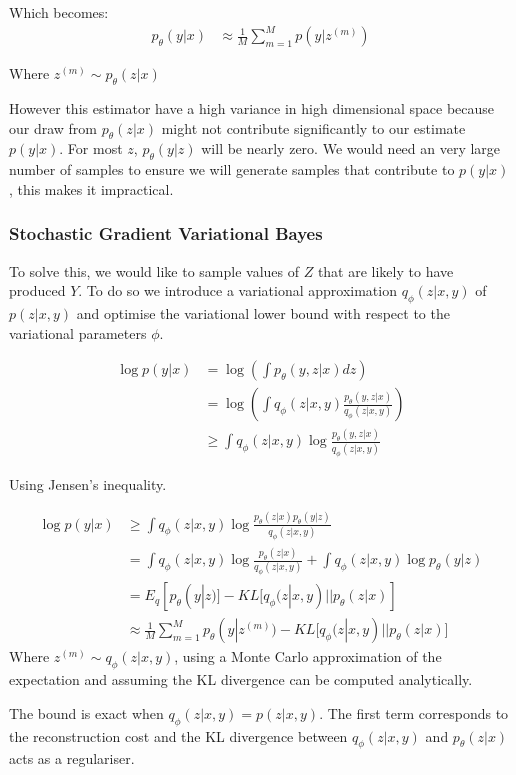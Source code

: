 \documentclass[11pt,oneside,openright]{report}
\begin{document}
Which becomes:
\begin{align}
 p_\theta(y|x) &\approx \frac{1}{M} \sum^M_{m=1} p(y | z^{(m)}) 
\end{align}

Where $ z^{(m)} \sim p_\theta(z|x) $

However this estimator have a high variance in high dimensional space because our draw from $p_\theta(z | x)$ might not contribute significantly to our estimate $p(y |x)$. For most $z$, $p_\theta(y|z)$ will be nearly zero. We would need an very large number of samples to ensure we will generate samples that contribute to $p(y|x)$, this makes it impractical.

\subsubsection{Stochastic Gradient Variational Bayes}

To solve this, we would like to sample values of $Z$ that are likely to have produced $Y$. To do so we introduce a variational approximation $q_\phi(z|x, y)$ of $p(z|x, y)$ and optimise the variational lower bound with respect to the variational parameters $\phi$.
 
\begin{align}
 \log p(y|x) &= \log(\int p_\theta(y, z|x) dz) \\
 & =  \log(\int q_\phi(z|x, y) \frac{p_\theta(y, z|x)}{q_\phi(z|x, y)}) \\
 & \geq \int q_\phi(z|x, y) \log \frac{p_\theta(y, z|x)}{q_\phi(z|x, y)}
\end{align}

Using Jensen's inequality.

\begin{align}
 \log p(y|x) & \geq \int q_\phi(z|x, y) \log \frac{p_\theta(z|x) p_\theta(y| z)}{q_\phi(z|x, y)} \\
  &= \int q_\phi(z|x, y) \log \frac{p_\theta(z|x)}{q_\phi(z|x, y)}  + \int q_\phi(z|x, y) \log p_\theta(y|z) \\
  &= E_q[p_\theta(y|z)] - KL\big[q_\phi(z|x, y) || p_\theta(z|x)]\\
  &\approx  \frac{1}{M} \sum^M_{m=1} p_\theta(y | z^{(m)}) - KL\big[q_\phi(z|x, y) || p_\theta(z|x)\big]
\end{align}
Where $ z^{(m)} \sim q_\phi(z|x, y)$, using a Monte Carlo approximation of the expectation and assuming the KL divergence can be computed analytically.

The bound is exact when $q_\phi(z| x, y) = p(z|x, y)$. The first term corresponds to the reconstruction cost and the KL divergence between $q_\phi(z|x, y)$ and $p_\theta(z|x)$ acts as a regulariser. 
\end{document}
